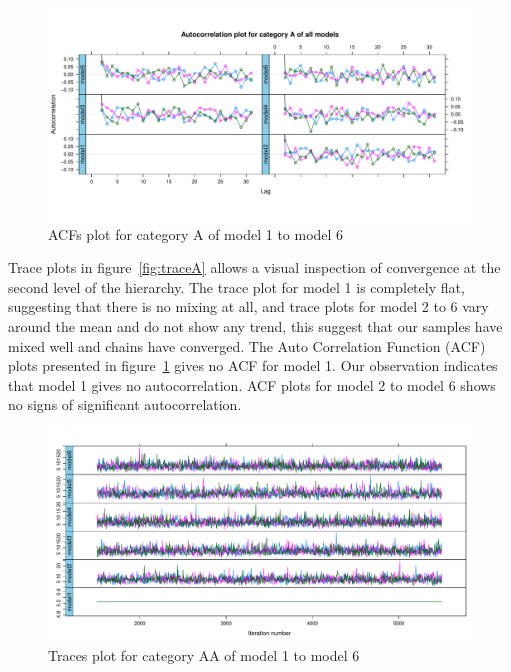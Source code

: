 \begin{figure}[!ht]
	\centering
	\includegraphics[width=1.0\linewidth]{../../R-codes/JAGS/plots/findmodel/AcfA3abn.PDF}
	\caption{ACFs plot for category A of model 1 to model 6}
	\label{fig:ACFA}
\end{figure}

Trace plots in figure~\ref{fig:traceA} allows a visual inspection of convergence at the second level of the hierarchy. The trace plot for model 1 is completely flat, suggesting that there is no mixing at all, and trace plots for model 2 to 6 vary around the mean and do not show any trend, this suggest that our samples have mixed well and chains have converged. The Auto Correlation Function (ACF) plots presented in figure~\ref{fig:ACFA} gives no ACF for model 1. Our observation indicates that model 1 gives no autocorrelation. ACF plots for model 2 to model 6 shows no signs of significant autocorrelation. 

\newpage %

\begin{figure}[!ht]
	\centering
	\includegraphics[width=1.0\linewidth]{../../R-codes/JAGS/plots/findmodel/TraceAA3abn.PDF}
	\caption{Traces plot for category AA of model 1 to model 6}
	\label{fig:traceAA}
\end{figure}

